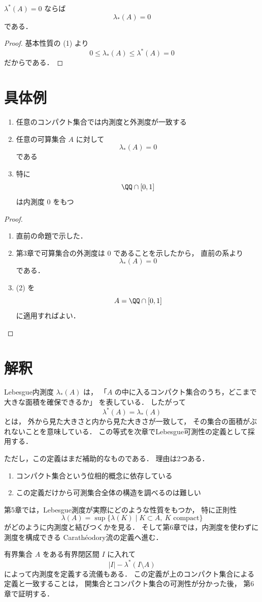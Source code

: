 \begin{corollary}[外測度零集合の内測度]
$\lambda^*(A)=0$ ならば
\[
\lambda_*(A)=0
\]
である．
\end{corollary}
\begin{proof}
基本性質の (1) より
\[
0 \le \lambda_*(A) \le \lambda^*(A)=0
\]
だからである．
\end{proof}

\section{具体例}

\begin{example}
\begin{enumerate}
    \item 任意のコンパクト集合では内測度と外測度が一致する
    \item 任意の可算集合 $A$ に対して
    \[
    \lambda_*(A)=0
    \]
    である
    \item 特に
    \[
    \QQ \cap [0,1]
    \]
    は内測度 $0$ をもつ
\end{enumerate}
\end{example}

\begin{proof}
\begin{enumerate}
    \item 直前の命題で示した．
    \item 第3章で可算集合の外測度は $0$ であることを示したから，
    直前の系より
    \[
    \lambda_*(A)=0
    \]
    である．
    \item (2) を
    \[
    A=\QQ \cap [0,1]
    \]
    に適用すればよい．
\end{enumerate}
\end{proof}

\section{解釈}

Lebesgue内測度 $\lambda_*(A)$ は，
「$A$ の中に入るコンパクト集合のうち，どこまで大きな面積を確保できるか」
を表している．
したがって
\[
\lambda^*(A)=\lambda_*(A)
\]
とは，
外から見た大きさと内から見た大きさが一致して，
その集合の面積がぶれないことを意味している．
この等式を次章でLebesgue可測性の定義として採用する．

ただし，この定義はまだ補助的なものである．
理由は2つある．
\begin{enumerate}
    \item コンパクト集合という位相的概念に依存している
    \item この定義だけから可測集合全体の構造を調べるのは難しい
\end{enumerate}
第5章では，Lebesgue測度が実際にどのような性質をもつか，
特に正則性
\[
\lambda(A)
=
\sup\{\lambda(K)\mid K \subset A,\ K \text{ compact}\}
\]
がどのように内測度と結びつくかを見る．
そして第6章では，内測度を使わずに測度を構成できる
Carathéodory流の定義へ進む．

\begin{remark}
有界集合 $A$ をある有界閉区間 $I$ に入れて
\[
|I|-\lambda^*(I\setminus A)
\]
によって内測度を定義する流儀もある．
この定義が上のコンパクト集合による定義と一致することは，
開集合とコンパクト集合の可測性が分かった後，
第6章で証明する．
\end{remark}
